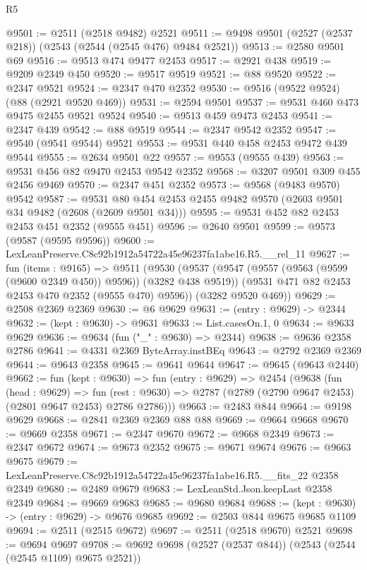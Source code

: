 \begin{lexlean}{R5}
\begin{coremodule}
@9501 := @2511 (@2518 @9482) @2521
@9511 := @9498 @9501 (@2527 (@2537 @218)) (@2543 (@2544 (@2545 @476) @9484 @2521))
@9513 := @2580 @9501 @69
@9516 := @9513 @474 @9477 @2453
@9517 := @2921 @438
@9519 := @9209 @2349 @450
@9520 := @9517 @9519
@9521 := @88 @9520
@9522 := @2347 @9521
@9524 := @2347 @470 @2352
@9530 := @9516 (@9522 @9524) (@88 (@2921 @9520 @469))
@9531 := @2594 @9501
@9537 := @9531 @460 @473 @9475 @2455 @9521 @9524
@9540 := @9513 @459 @9473 @2453
@9541 := @2347 @439
@9542 := @88 @9519
@9544 := @2347 @9542 @2352
@9547 := @9540 (@9541 @9544) @9521
@9553 := @9531 @440 @458 @2453 @9472 @439 @9544
@9555 := @2634 @9501 @22
@9557 := @9553 (@9555 @439)
@9563 := @9531 @456 @82 @9470 @2453 @9542 @2352
@9568 := @3207 @9501 @309 @455 @2456 @9469
@9570 := @2347 @451 @2352
@9573 := @9568 (@9483 @9570) @9542
@9587 := @9531 @80 @454 @2453 @2455 @9482 @9570 (@2603 @9501 @34 @9482 (@2608 (@2609 @9501 @34)))
@9595 := @9531 @452 @82 @2453 @2453 @451 @2352 (@9555 @451)
@9596 := @2640 @9501
@9599 := @9573 (@9587 (@9595 @9596))
@9600 := LexLeanPreserve.C8c92b1912a54722a45e96237fa1abe16.R5.__rel_11
@9627 := fun (items : @9165) =>
  @9511
    (@9530
      (@9537
        (@9547 (@9557 (@9563 (@9599 (@9600 @2349 @450)) @9596)) (@3282 @438 @9519))
        (@9531 @471 @82 @2453 @2453 @470 @2352 (@9555 @470) @9596))
      (@3282 @9520 @469))
@9629 := @2508 @2369 @2369
@9630 := @6 @9629
@9631 := (entry : @9629) -> @2344
@9632 := (kept : @9630) -> @9631
@9633 := List.casesOn.{1, 0}
@9634 := @9633 @9629
@9636 := @9634 (fun ("_" : @9630) => @2344)
@9638 := @9636 @2358 @2786
@9641 := @4331 @2369 ByteArray.instBEq
@9643 := @2792 @2369 @2369
@9644 := @9643 @2358
@9645 := @9641 @9644
@9647 := @9645 (@9643 @2440)
@9662 := fun (kept : @9630) =>
  fun (entry : @9629) =>
  @2454
    (@9638
      (fun (head : @9629) =>
      fun (rest : @9630) => @2787 (@2789 (@2790 @9647 @2453) (@2801 @9647 @2453) @2786 @2786)))
@9663 := @2483 @844
@9664 := @9198 @9629
@9668 := @2841 @2369 @2369 @88 @88
@9669 := @9664 @9668
@9670 := @9669 @2358
@9671 := @2347 @9670
@9672 := @9668 @2349
@9673 := @2347 @9672
@9674 := @9673 @2352
@9675 := @9671 @9674
@9676 := @9663 @9675
@9679 := LexLeanPreserve.C8c92b1912a54722a45e96237fa1abe16.R5.__fits_22 @2358 @2349
@9680 := @2489 @9679
@9683 := LexLeanStd.Json.keepLast @2358 @2349
@9684 := @9669 @9683
@9685 := @9680 @9684
@9688 := (kept : @9630) -> (entry : @9629) -> @9676 @9685
@9692 := @2503 @844 @9675 @9685 @1109
@9694 := @2511 (@2515 @9672)
@9697 := @2511 (@2518 @9670) @2521
@9698 := @9694 @9697
@9708 := @9692 @9698 (@2527 (@2537 @844)) (@2543 (@2544 (@2545 @1109) @9675 @2521))

\end{coremodule}
\end{lexlean}
